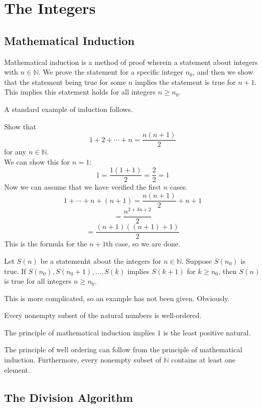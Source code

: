 \documentclass[12pt, letterpaper]{report}
\begin{document}
\chapter{The Integers}
\section{Mathematical Induction}
\begin{definition}
	Mathematical induction is a method of proof wherein a statement about integers with \(n\in\mathbb{N} \). We prove the statement for a specific integer \(n_0\), and then we show that the statement being true for some \(n\) implies the statement is true for \(n+1\). This implies this statement holds for all integers \(n\geq n_0\).
\end{definition}
A standard example of induction follows. 
\begin{eg}
	Show that
	\[
		1+2+\cdots+n=\frac{n(n+1)}{2}
	\]
	for any \(n\in\mathbb{N} \).\\
	We can show this for \(n=1\):
	\[
		1=\frac{1(1+1)}{2}=\frac{2}{2}=1
	\]
	Now we can assume that we have verified the first \(n\) cases.
	\[
		1+\cdots+n+(n+1)=\frac{n(n+1)}{2}+n+1
	\]
	\[
		=\frac{n^{2+3n+2} }{2}
	\]
	\[
		=\frac{(n+1)((n+1)+1)}{2}
	\]
	This is the formula for the \(n+1\)th case, so we are done.
\end{eg}
\begin{definition}
	Let \(S(n)\) be a statemenht about the integers for \(n\in\mathbb{N} \). Suppose \(S(n_0)\) is true. If \(S(n_0),S(n_{0}+1 ),\ldots,S(k)\) implies \(S(k+1)\) for \(k\geq n_0\), then \(S(n)\) is true for all integers \(n\geq n_{0} \).
\end{definition}
This is more complicated, so an example has not been given. Obviously.
\begin{definition}
	Every nonempty subset of the natural numbers is well-ordered.
\end{definition}
\begin{lemma}
	The principle of mathematical induction implies \(1\) is the least positive natural.
\end{lemma}
\begin{theorem}
	The principle of well ordering can follow from the principle of mathematical induction. Furthermore, every nonempty subset of \(\mathbb{N} \) contains at least one element.
\end{theorem}
\section{The Division Algorithm}
\end{document}

